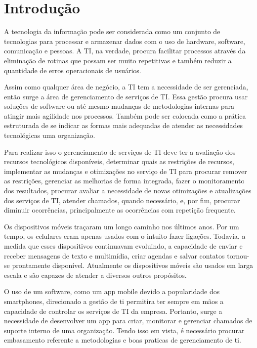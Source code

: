 \chapter*{Introdução} \label{chap:intro}

A tecnologia da informação pode ser considerada como um conjunto de tecnologias para processar e armazenar dados com o uso de hardware, software, comunicação e pessoas. A TI, na verdade, procura facilitar processos através da eliminação de rotinas que possam ser muito repetitivas e também reduzir a quantidade de erros operacionais de usuários. 

Assim como qualquer área de negócio, a TI tem a necessidade de ser gerenciada, então surge a área de gerenciamento de serviços de TI. Essa gestão procura usar soluções de software ou até mesmo mudanças de metodologias internas para atingir mais agilidade nos processos. Também pode ser colocada como a prática estruturada de se indicar as formas mais adequadas de atender as necessidades tecnológicas uma organização. 

Para realizar isso o gerenciamento de serviços de TI deve ter a avaliação dos recursos tecnológicos disponíveis, determinar quais as restrições de recursos, implementar as mudanças e otimizações no serviço de TI para procurar remover as restrições, gerenciar as melhorias de forma integrada, fazer o monitoramento dos resultados, procurar avaliar a necessidade de novas otimizações e atualizações dos serviços de TI, atender chamados, quando necessário, e, por fim, procurar diminuir ocorrências, principalmente as ocorrências com repetição frequente.

Os dispositivos móveis traçaram um longo caminho nos últimos anos. Por um tempo, os  celulares eram apenas usados com o intuito fazer ligações. Todavia, a medida que esses dispositivos continuavam evoluindo, a capacidade de enviar e receber mensagens de texto e multimídia, criar agendas e salvar contatos tornou-se prontamente disponível. Atualmente os dispositivos móveis são usados em larga escala e são capazes de atender a diversos outros propósitos.

O uso de um software, como um app mobile devido a popularidade dos smartphones, direcionado a gestão de ti permitira ter sempre em mãos a capacidade de controlar os serviços de TI da empresa. Portanto, surge a necessidade de desenvolver um app para criar, monitorar e gerenciar chamados de suporte interno de uma organização. Tendo isso em vista, é necessário procurar embasamento referente a metodologias e boas praticas de gerenciamento de ti.

